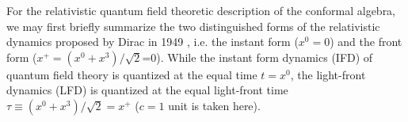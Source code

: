 \documentclass[%
 reprint,
superscriptaddress,
 amsmath,amssymb,
 aps,
]{revtex4-2}
\begin{document}

For the relativistic quantum field theoretic description of the conformal algebra, we may first briefly summarize the two distinguished forms of the relativistic dynamics proposed by Dirac  
in 1949 \cite{Dirac1949}, i.e. the instant form ($x^{0}=0$) and the front form ($x^{+}=(x^{0}+x^{3})/\sqrt{2}$=0). 
While the instant form dynamics (IFD) of quantum field theory is quantized at the equal time $t=x^{0}$, the light-front dynamics (LFD) is quantized at the equal light-front time $\tau \equiv (x^{0}+x^{3})/\sqrt{2}=x^{+}$ ($c=1$ unit is taken here).
\end{document}

